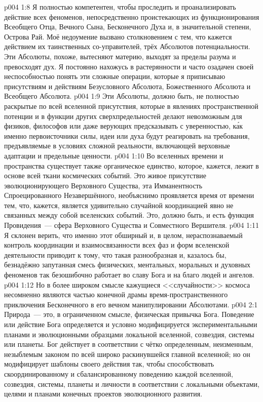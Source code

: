 \vs p004 1:8 Я полностью компетентен, чтобы проследить и проанализировать действие всех феноменов, непосредственно проистекающих из функционирования Всеобщего Отца, Вечного Сына, Бесконечного Духа и, в значительной степени, Острова Рай. Моё недоумение вызвано столкновением с тем, что кажется действием их таинственных со\hyp{}управителей, трёх Абсолютов потенциальности. Эти Абсолюты, похоже, вытесняют материю, выходят за пределы разума и превосходят дух. Я постоянно нахожусь в растерянности и часто озадачен своей неспособностью понять эти сложные операции, которые я приписываю присутствиям и действиям Безусловного Абсолюта, Божественного Абсолюта и Всеобщего Абсолюта.
\vs p004 1:9 Эти Абсолюты, должно быть, не полностью раскрытые по всей вселенной присутствия, которые в явлениях пространственной потенции и в функции других сверхпредельностей делают невозможным для физиков, философов или даже верующих предсказывать с уверенностью, к\'ак именно первоисточники силы, идеи или духа будут реагировать на требования, предъявляемые в условиях сложной реальности, включающей верховные адаптации и предельные ценности.
\vs p004 1:10 \pc Во вселенных времени и пространства существует также органическое единство, которое, кажется, лежит в основе всей ткани космических событий. Это живое присутствие эволюционирующего Верховного Существа, эта Имманентность Спроецированного Незавершённого, необъяснимо проявляется время от времени тем, что, кажется, является удивительно случайной координацией явно не связанных между собой вселенских событий. Это, должно быть, и есть функция Провидения~--- сфера Верховного Существа и Совместного Вершителя.
\vs p004 1:11 Я склонен верить, что именно этот обширный и, в целом, нераспознаваемый контроль координации и взаимосвязанности всех фаз и форм вселенской деятельности приводит к тому, что такая разнообразная и, казалось бы, безнадёжно запутанная смесь физических, ментальных, моральных и духовных феноменов так безошибочно работает во славу Бога и на благо людей и ангелов.
\vs p004 1:12 Но в более широком смысле кажущиеся <<случайности>> космоса несомненно являются частью конечной драмы время\hyp{}пространственного приключения Бесконечного в его вечном манипулировании Абсолютами.
\vs p004 2:1 Природа~--- это, в ограниченном смысле, физическая привычка Бога. Поведение или действие Бога определяется и условно модифицируется экспериментальными планами и эволюционными образцами локальной вселенной, созвездия, системы или планеты. Бог действует в соответствии с чётко определенным, неизменным, незыблемым законом по всей широко раскинувшейся главной вселенной; но он модифицирует шаблоны своего действия так, чтобы способствовать скоординированному и сбалансированному поведению каждой вселенной, созвездия, системы, планеты и личности в соответствии с локальными объектами, целями и планами конечных проектов эволюционного развития.
